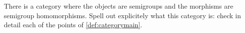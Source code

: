 

\vfill
\begin{gradedexercise}
    There is a category where the objects are semigroups and the morphisms are semigroup homomorphisms.
    Spell out explicitely what this category is: check in detail each of the points of \cref{def:categorymain}.
\end{gradedexercise}


